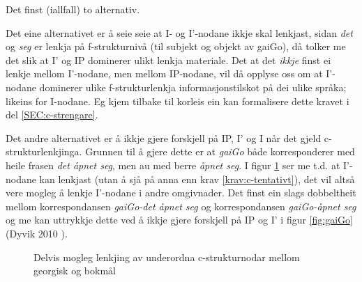 \documentclass[11pt,a4paper,oneside,draft]{report}
\newcommand{\proj}[2]{\begin{tabular}{c}\footnotesize{#1}\\\normalsize{#2}\end{tabular}}
\newcommand{\ua}{\ensuremath{\uparrow}}
\newcommand{\da}{\ensuremath{\downarrow}}
\begin{document}
Det finst (iallfall) to alternativ. 

Det eine alternativet er å seie seie at I- og I'-nodane ikkje skal
lenkjast, sidan \emph{det} og \emph{seg} er lenkja på f-strukturnivå (til
subjekt og objekt av gaiGo), då tolker me det slik at I' og IP
dominerer ulikt lenkja materiale. Det at det \emph{ikkje} finst ei lenkje
mellom I'-nodane, men mellom IP-nodane, vil då opplyse oss om at
I'-nodane dominerer ulike f-strukturlenkja informasjonstilskot på dei
ulike språka; likeins for I-nodane. Eg kjem tilbake til korleis ein
kan formalisere dette kravet i del \ref{SEC:c-strengare}.

 Det andre alternativet er å ikkje gjere forskjell på IP, I' og I når
 det gjeld c-strukturlenkjinga. Grunnen til å gjere dette er at
 \emph{gaiGo} både korresponderer med heile frasen \emph{det åpnet seg}, men au
 med berre \emph{åpnet seg}.  I figur \ref{fig:PanJara-gaiGo} ser me
 t.d. at I'-nodane kan lenkjast (utan å sjå på anna enn krav
 \ref{krav:c-tentativt}), det vil altså vere mogleg å lenkje I'-nodane
 i andre omgivnader. Det finst ein slags dobbeltheit mellom
 korrespondansen \emph{gaiGo-det åpnet seg} og korrespondansen \emph{gaiGo-åpnet  seg} og me kan uttrykkje dette ved å ikkje gjere forskjell på IP og
 I' i figur \ref{fig:gaiGo} (Dyvik 2010
 \citep{dyvik2010pc}).

\begin{figure}[htp]
\centering
{}
\caption{Delvis mogleg lenkjing av underordna c-strukturnodar mellom georgisk og bokmål}
 \label{fig:PanJara-gaiGo}
\end{figure}
\end{document}
